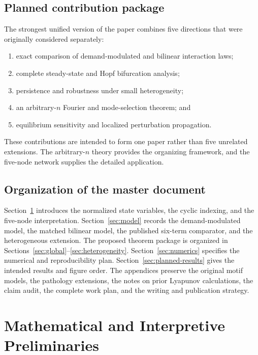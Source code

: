 \documentclass[11pt, reqno]{amsart}
\theoremstyle{definition}
\theoremstyle{remark}
\begin{document}
\subsection{Planned contribution package}

The strongest unified version of the paper combines five directions that were
originally considered separately:

\begin{enumerate}[label=(\roman*),leftmargin=2.5em]
    \item exact comparison of demand-modulated and bilinear interaction laws;
    \item complete steady-state and Hopf bifurcation analysis;
    \item persistence and robustness under small heterogeneity;
    \item an arbitrary-$n$ Fourier and mode-selection theorem; and
    \item equilibrium sensitivity and localized perturbation propagation.
\end{enumerate}

These contributions are intended to form one paper rather than five unrelated
extensions.  The arbitrary-$n$ theory provides the organizing framework, and
the five-node network supplies the detailed application.

\subsection{Organization of the master document}

Section~\ref{sec:preliminaries} introduces the normalized state variables, the
cyclic indexing, and the five-node interpretation.  Section~\ref{sec:model}
records the demand-modulated model, the matched bilinear model, the published
six-term comparator, and the heterogeneous extension.  The proposed theorem
package is organized in Sections~\ref{sec:global}--\ref{sec:heterogeneity}.
Section~\ref{sec:numerics} specifies the numerical and reproducibility plan.
Section~\ref{sec:planned-results} gives the intended results and figure order.
The appendices preserve the original motif models, the pathology extensions,
the notes on prior Lyapunov calculations, the claim audit, the complete work
plan, and the writing and publication strategy.

\section{Mathematical and Interpretive Preliminaries}
\label{sec:preliminaries}
\end{document}
